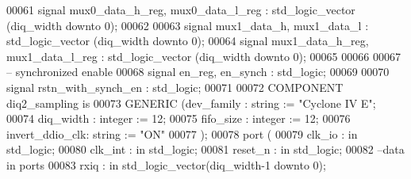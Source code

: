 \begin{DoxyCode}
00061 \textcolor{keywordflow}{signal} \textcolor{vhdlchar}{mux0_data_h_reg}\textcolor{vhdlchar}{,} \textcolor{vhdlchar}{mux0_data_l_reg}     \textcolor{vhdlchar}{:} \textcolor{comment}{std\_logic\_vector} \textcolor{vhdlchar}{(}\textcolor{vhdlchar}{diq_width} \textcolor{keywordflow}{downto} \textcolor{vhdllogic}{}\textcolor{vhdllogic}{0}\textcolor{vhdlchar}{)};
00062 
00063 \textcolor{keywordflow}{signal} \textcolor{vhdlchar}{mux1_data_h}\textcolor{vhdlchar}{,} \textcolor{vhdlchar}{mux1_data_l}                 \textcolor{vhdlchar}{:} \textcolor{comment}{std\_logic\_vector} \textcolor{vhdlchar}{(}\textcolor{vhdlchar}{diq_width} \textcolor{keywordflow}{downto} \textcolor{vhdllogic}{}\textcolor{vhdllogic}{0}\textcolor{vhdlchar}{)};
00064 \textcolor{keywordflow}{signal} \textcolor{vhdlchar}{mux1_data_h_reg}\textcolor{vhdlchar}{,} \textcolor{vhdlchar}{mux1_data_l_reg}     \textcolor{vhdlchar}{:} \textcolor{comment}{std\_logic\_vector} \textcolor{vhdlchar}{(}\textcolor{vhdlchar}{diq_width} \textcolor{keywordflow}{downto} \textcolor{vhdllogic}{}\textcolor{vhdllogic}{0}\textcolor{vhdlchar}{)};
00065 
00066 
00067 \textcolor{keyword}{-- synchronized enable}
00068 \textcolor{keywordflow}{signal} \textcolor{vhdlchar}{en_reg}\textcolor{vhdlchar}{,} \textcolor{vhdlchar}{en_synch} \textcolor{vhdlchar}{:} \textcolor{comment}{std\_logic}; 
00069 
00070 \textcolor{keywordflow}{signal} \textcolor{vhdlchar}{rstn_with_synch_en}   \textcolor{vhdlchar}{:} \textcolor{comment}{std\_logic};
00071     
00072 \textcolor{keywordflow}{COMPONENT} diq2_sampling \textcolor{keywordflow}{is}
00073     \textcolor{keywordflow}{GENERIC} (dev_family     : \textcolor{comment}{string}        := \textcolor{keyword}{"Cyclone IV E"};
00074                 diq_width       : \textcolor{comment}{integer}   := \textcolor{vhdllogic}{}\textcolor{vhdllogic}{12};
00075                 fifo_size       : \textcolor{comment}{integer}   := \textcolor{vhdllogic}{}\textcolor{vhdllogic}{12};
00076                 invert_ddio_clk: \textcolor{comment}{string}     := \textcolor{keyword}{"ON"}
00077                 );
00078     \textcolor{keywordflow}{port} (
00079         clk_io          : \textcolor{keywordflow}{in} \textcolor{comment}{std\_logic};
00080         clk_int         : \textcolor{keywordflow}{in} \textcolor{comment}{std\_logic};
00081         reset_n         : \textcolor{keywordflow}{in} \textcolor{comment}{std\_logic};
00082 \textcolor{keyword}{        --data in ports}
00083         rxiq                : \textcolor{keywordflow}{in} \textcolor{comment}{std\_logic\_vector}(diq_width\textcolor{vhdlchar}{-}\textcolor{vhdllogic}{}\textcolor{vhdllogic}{1} \textcolor{keywordflow}{downto} \textcolor{vhdllogic}{}\textcolor{vhdllogic}{0});

\end{DoxyCode}

